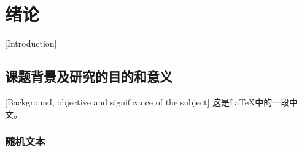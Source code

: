 
\chapter{绪论}[Introduction]
\section{课题背景及研究的目的和意义}[Background, objective and significance of the subject]
这是\LaTeX 中的一段中文\cite{IIE_Open_Doors_2015}。

\subsection{随机文本}
\lipsum[1]

\nocite{*}

